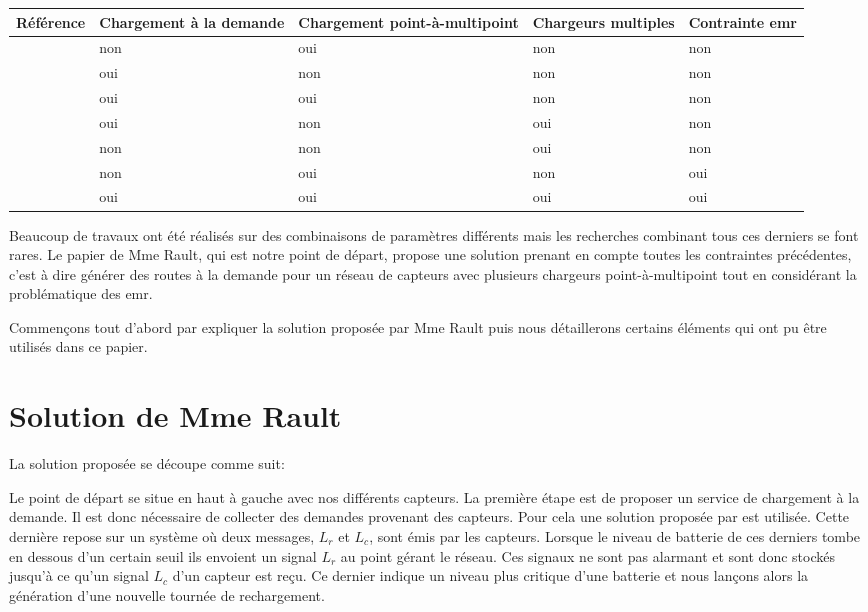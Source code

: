 \documentclass[final]{polytech/polytech}
\begin{document}
	\begin{center}
		\centering
		\begin{tabularx}{\textwidth}{|c||X|X|X|X|}
			\hline
			Référence & Chargement à la demande & Chargement point-à-multipoint & Chargeurs multiples & Contrainte \gls{emr}\\\hline\hline
			\cite{6275766} \cite{LIN2016381} & non & oui & non & non\\\hline
			\cite{6911792} \cite{1999253} & oui & non & non & non\\\hline
			\cite{KHELLADI201744} & oui & oui & non & non\\\hline
			\cite{LIN201688} \cite{Madhja2015} \cite{wang2013multi} \cite{Jiang2014} & oui & non & oui & non\\\hline
			\cite{7889006} & non & non & oui & non\\\hline
			\cite{NIKOLETSEAS20171} \cite{8051273} \cite{6888920} \cite{7524385} & non & oui & non & oui\\\hline\hline
			\rowcolor{polytechlightblue}
			\cite{Rault:chargers} & oui & oui & oui & oui\\\hline
		\end{tabularx}	
	\end{center}
	
	Beaucoup de travaux ont été réalisés sur des combinaisons de paramètres différents mais les recherches combinant tous ces derniers se font rares.
	Le papier de Mme Rault, qui est notre point de départ, propose une solution prenant en compte toutes les contraintes précédentes, c'est à dire générer des routes à la demande pour un réseau de capteurs avec plusieurs chargeurs point-à-multipoint tout en considérant la problématique des \gls{emr}.
	
	Commençons tout d'abord par expliquer la solution proposée par Mme Rault puis nous détaillerons certains éléments qui ont pu être utilisés dans ce papier.
			
	\section{Solution de Mme Rault}
		La solution proposée se découpe comme suit:
	
	
		Le point de départ se situe en haut à gauche avec nos différents capteurs.
		La première étape est de proposer un service de chargement à la demande.
		Il est donc nécessaire de collecter des demandes provenant des capteurs.
		Pour cela une solution proposée par \cite{KHELLADI201744} est utilisée.
		Cette dernière repose sur un système où deux messages, $L_r$ et $L_c$, sont émis par les capteurs.
		Lorsque le niveau de batterie de ces derniers tombe en dessous d'un certain seuil ils envoient un signal $L_r$ au point gérant le réseau.
		Ces signaux ne sont pas alarmant et sont donc stockés jusqu'à ce qu'un signal $L_c$ d'un capteur est reçu.
		Ce dernier indique un niveau plus critique d'une batterie et nous lançons alors la génération d'une nouvelle tournée de rechargement.
	
\end{document}
